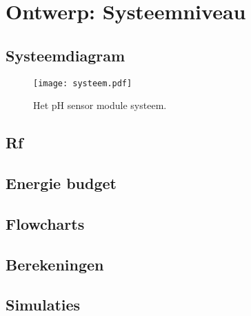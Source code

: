 \section{Ontwerp: Systeemniveau}
\subsection{Systeemdiagram}
\begin{figure}[ht]
    \centering
    \texttt{[image: systeem.pdf]}
    \caption[short]{Het pH sensor module systeem.}
    \label{fig:functional}
\end{figure}


\subsection{Rf}

\subsection{Energie budget}

\subsection{Flowcharts}
\subsection{Berekeningen}
\subsection{Simulaties}




%
